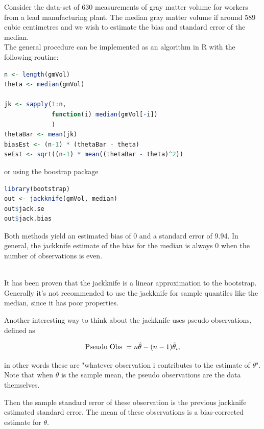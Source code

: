\documentclass{homework}
\begin{document}
\begin{tcolorbox}[title=Example: Using the Jackknife]

Consider the data-set of $630$ measurements of gray matter volume for workers from a lead manufacturing plant. The median gray matter volume if around 589 cubic centimetres and we wish to estimate the bias and standard error of the median. \\

The general procedure can be implemented as an algorithm in R with the following routine:

\begin{lstlisting}[language=R]
n <- length(gmVol)
theta <- median(gmVol)

jk <- sapply(1:n, 
             function(i) median(gmVol[-i])
             )
thetaBar <- mean(jk)
biasEst <- (n-1) * (thetaBar - theta)
seEst <- sqrt((n-1) * mean((thetaBar - theta)^2))
\end{lstlisting}

or using the boostrap package

\begin{lstlisting}[language=R]
library(bootstrap)
out <- jackknife(gmVol, median)
out$jack.se
out$jack.bias
\end{lstlisting}

Both methods yield an estimated bias of 0 and a standard error of 9.94. In general, the jackknife estimate of the bias for the median is always 0 when the number of observations is even. 
\end{tcolorbox}

\textnormal{ } \\

It has been proven that the jackknife is a linear approximation to the bootstrap. Generally it's not recommended to use the jackknife for sample quantiles like the median, since it has poor properties. 

Another interesting way to think about the jackknife uses pseudo observations, defined as 

$$
\textnormal{Pseudo Obs } = n \hat{\theta} - (n-1)\hat{\theta}_i,
$$

in other words these are "whatever observation i contributes to the estimate of $\theta$". Note that when $\theta$ is the sample mean, the pseudo observations are the data themselves. 

Then the sample standard error of these observation is the previous jackknife estimated standard error. The mean of these observations is a bias-corrected estimate for $\theta$. 
\end{document}
